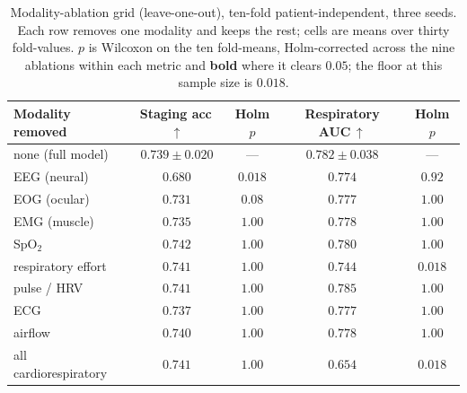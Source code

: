 \documentclass{ieeeaccess}
\begin{document}
\begin{table}[t]
\caption{Modality-ablation grid (leave-one-out), ten-fold patient-independent,
three seeds. Each row removes one modality and keeps the rest; cells are means over
thirty fold-values. $p$ is Wilcoxon on the ten fold-means, Holm-corrected across the
nine ablations within each metric and \textbf{bold} where it clears $0.05$; the
floor at this sample size is $0.018$.}
\label{tab:ablate}
\centering
\setlength{\tabcolsep}{14pt}
\begin{tabular}{lcccc}
\toprule
Modality removed & Staging acc\,$\uparrow$ & Holm $p$ & Respiratory AUC\,$\uparrow$ & Holm $p$ \\
\midrule
 none (full model)        & $0.739 \pm 0.020$   & ---                 & $0.782 \pm 0.038$   & --- \\
 EEG (neural)             & $0.680$             & $\mathbf{0.018}$    & $0.774$             & $0.92$ \\
 EOG (ocular)             & $0.731$             & $0.08$              & $0.777$             & $1.00$ \\
 EMG (muscle)             & $0.735$             & $1.00$              & $0.778$             & $1.00$ \\
 SpO$_2$                  & $0.742$             & $1.00$              & $0.780$             & $1.00$ \\
 respiratory effort       & $0.741$             & $1.00$              & $0.744$             & $\mathbf{0.018}$ \\
 pulse / HRV              & $0.741$             & $1.00$              & $0.785$             & $1.00$ \\
 ECG                      & $0.737$             & $1.00$              & $0.777$             & $1.00$ \\
 airflow                  & $0.740$             & $1.00$              & $0.778$             & $1.00$ \\
 all cardiorespiratory    & $0.741$             & $1.00$              & $0.654$             & $\mathbf{0.018}$ \\
\bottomrule
\end{tabular}
\end{table}
\end{document}
